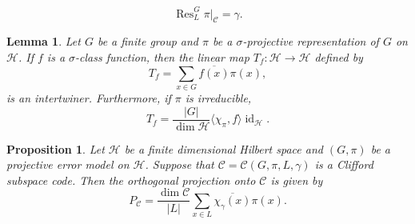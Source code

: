 \documentclass[10pt,a4paper]{amsart}
\newtheorem{lemma}{Lemma}
\newtheorem{proposition}{Proposition}
\newcommand{\Res}{\operatorname{Res}}
\newcommand{\calC}{\mathcal{C}}
\newcommand{\calH}{\mathcal{H}}
\newcommand{\id}{\operatorname{id}}
\begin{document}
    \begin{equation}\label{eqn:clifford code representation}
        \Res^G_L\pi|_\calC = \gamma.
    \end{equation}

\begin{lemma}\label{lemma:intertwiners from class functions}
    Let $G$ be a finite group and $\pi$ be a $\sigma$-projective representation of $G$ on $\calH$. If $f$ is a $\sigma$-class function, then the linear map $T_f \colon \calH \to \calH$ defined by
    \begin{equation*}
        T_f = \sum_{x \in G}\overline{f(x)}\pi(x),
    \end{equation*}
    is an intertwiner. Furthermore, if $\pi$ is irreducible,
    \begin{equation*}
        T_f = \frac{|G|}{\dim\calH}\langle \chi_\pi, f \rangle \id_\calH.
    \end{equation*}
\end{lemma}

\begin{proposition}\label{lemma:code projection}
    Let $\calH$ be a finite dimensional Hilbert space and $(G,\pi)$ be a projective error model on $\calH$. Suppose that $\calC = \calC(G,\pi,L,\gamma)$ is a Clifford subspace code. Then the orthogonal projection onto $\calC$ is given by
    \begin{equation*}
        P_\calC = \frac{\dim\calC}{|L|}\sum_{x \in L}\overline{\chi_\gamma(x)}\pi(x).
    \end{equation*}
\end{proposition}
\end{document}
